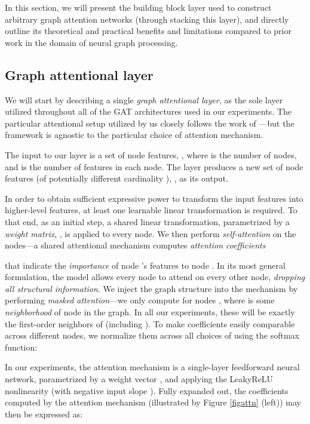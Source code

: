 \documentclass{article} \usepackage{iclr2018_conference,times}
\begin{document}
In this section, we will present the building block layer used to construct arbitrary graph attention networks (through stacking this layer), and directly outline its theoretical and practical benefits and limitations compared to prior work in the domain of neural graph processing.

\subsection{Graph attentional layer}
\label{ssec:gal}
We will start by describing a single \emph{graph attentional layer}, as the sole layer utilized throughout all of the GAT architectures used in our experiments. The particular attentional setup utilized by us closely follows 
the work of \cite{bahdanau2014neural}---but the framework is agnostic to the particular choice of attention mechanism.

The input to our layer is a set of node features, , where  is the number of nodes, and  is the number of features in each node. The layer produces a new set of node features (of potentially different cardinality ), , as its output.

In order to obtain sufficient expressive power to transform the input features into higher-level features, at least one learnable linear transformation is required. To that end, as an initial step, a shared linear transformation, parametrized by a \emph{weight matrix}, , is applied to every node. We then perform \emph{self-attention} on the nodes---a shared attentional mechanism  computes \emph{attention coefficients} 

that indicate the \emph{importance} of node 's features to node . In its most general formulation, the model allows every node to attend on every other node, \emph{dropping all structural information}. We inject the graph structure into the mechanism by performing \emph{masked attention}---we only compute  for nodes , where  is some \emph{neighborhood} of node  in the graph. In all our experiments, these will be exactly the first-order neighbors of  (including ). To make coefficients easily comparable across different nodes, we normalize them across all choices of  using the softmax function:

In our experiments, the attention mechanism  is a single-layer feedforward neural network, parametrized by a weight vector , and applying the LeakyReLU nonlinearity (with negative input slope ). Fully expanded out, the coefficients computed by the attention mechanism (illustrated by Figure \ref{figattn} (left)) may then be expressed as:
\end{document}
